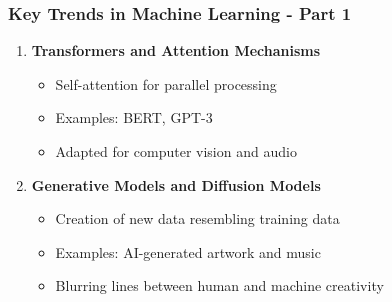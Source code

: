 \documentclass[aspectratio=169]{beamer}
\begin{document}
\begin{frame}[fragile]
    \frametitle{Key Trends in Machine Learning - Part 1}
    \begin{enumerate}
        \item \textbf{Transformers and Attention Mechanisms}
        \begin{itemize}
            \item Self-attention for parallel processing
            \item Examples: BERT, GPT-3
            \item Adapted for computer vision and audio
        \end{itemize}
        
        \item \textbf{Generative Models and Diffusion Models}
        \begin{itemize}
            \item Creation of new data resembling training data
            \item Examples: AI-generated artwork and music
            \item Blurring lines between human and machine creativity
        \end{itemize}
    \end{enumerate}
\end{frame}
\end{document}
